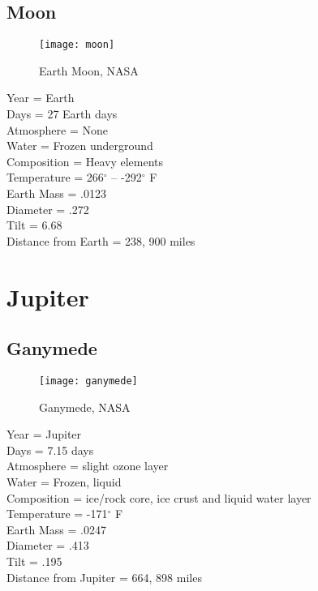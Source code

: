 \documentclass[12pt]{book}
\begin{document}
\subsection{Moon}
 \begin{wrapfigure}{R}{0.4\textwidth}
         \vspace{-1cm}
        \begin{center}
        \texttt{[image: moon]}\caption{\scriptsize Earth Moon, NASA}
        \end{center}
         \vspace{-1cm}
    \end{wrapfigure}
Year = Earth\\
Days = 27 Earth days\\
Atmosphere = None\\
Water = Frozen underground\\
Composition = Heavy elements\\
Temperature = 266$^{\circ}$ -- -292$^{\circ}$ F\\
Earth Mass = .0123\\
Diameter = .272\\ 
Tilt = 6.68\\
Distance from Earth = 238, 900 miles\\
\section{Jupiter}
\subsection{Ganymede}
 \begin{wrapfigure}{R}{0.4\textwidth}
         \vspace{-1cm}
        \begin{center}
        \texttt{[image: ganymede]}\caption{\scriptsize Ganymede, NASA}
        \end{center}
         \vspace{-1cm}
    \end{wrapfigure}
Year = Jupiter\\
Days = 7.15 days\\
Atmosphere = slight ozone layer\\
Water = Frozen, liquid\\
Composition = ice/rock core, ice crust and liquid water layer\\
Temperature = -171$^{\circ}$ F\\
Earth Mass = .0247\\
Diameter = .413\\ 
Tilt = .195\\
Distance from Jupiter = 664, 898 miles\\
\end{document}
